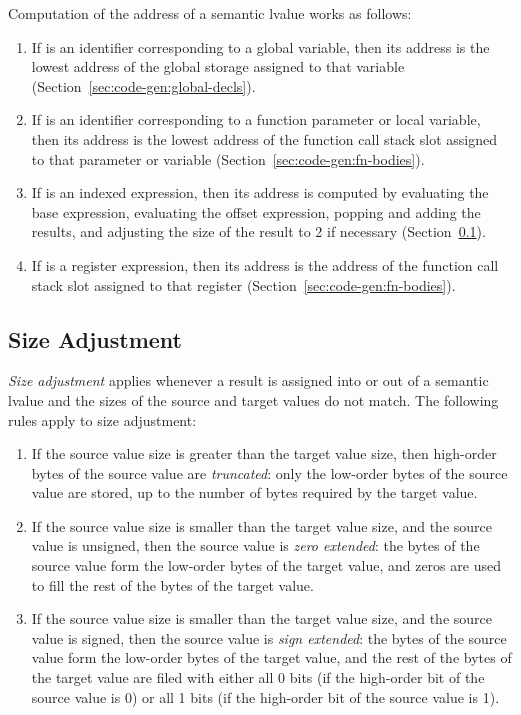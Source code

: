 \documentclass[10pt]{article}
\begin{document}
Computation of the address of a semantic lvalue  works
as follows:
%
\begin{enumerate}
%
\item If  is an identifier corresponding to a global
  variable, then its address is the lowest address of the global
  storage assigned to that variable
  (Section~\ref{sec:code-gen:global-decls}). 
%
\item If  is an identifier corresponding to a function
  parameter or local variable, then its address is the lowest address
  of the function call stack slot assigned to that parameter or
  variable (Section~\ref{sec:code-gen:fn-bodies}).
%
\item If  is an indexed expression, then its address is
  computed by evaluating the base expression, evaluating the offset
  expression, popping and adding the results, and adjusting the size
  of the result to 2 if necessary
  (Section~\ref{sec:code-gen:size-adjustment}). 
%
\item If  is a register expression, then its address is
  the address of the function call stack slot assigned to that
  register (Section~\ref{sec:code-gen:fn-bodies}).
%
\end{enumerate}


\subsection{Size Adjustment}
\label{sec:code-gen:size-adjustment}

\emph{Size adjustment} applies whenever a result is assigned into or
out of a semantic lvalue and the sizes of the source and target values
do not match.  The following rules apply to size adjustment:
%
\begin{enumerate}
%
\item If the source value size is greater than the target value size,
  then high-order bytes of the source value are \emph{truncated}: only
  the low-order bytes of the source value are stored, up to the number
  of bytes required by the target value.
%
\item If the source value size is smaller than the target value size,
  and the source value is unsigned, then the source value is
  \emph{zero extended}:  the bytes of the source value form the
  low-order bytes of the target value, and zeros are used to fill the
  rest of the bytes of the target value.
%
\item If the source value size is smaller than the target value size,
  and the source value is signed, then the source value is \emph{sign
    extended}: the bytes of the source value form the low-order bytes
  of the target value, and the rest of the bytes of the target value
  are filed with either all 0 bits (if the high-order bit of the
  source value is 0) or all 1 bits (if the high-order bit of the
  source value is 1).
%
\end{enumerate}
\end{document}
